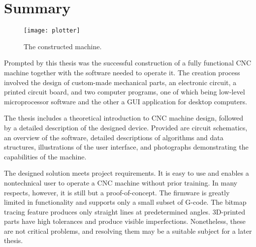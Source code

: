 \clearpage
\section{Summary}

\begin{figure}[ht]
    \begin{center}
        \texttt{[image: plotter]}
        \caption{The constructed machine.}
    \end{center}
\end{figure}

Prompted by this thesis was the successful construction of a fully functional CNC
machine together with the software needed to operate it. The creation process
involved the design of custom-made mechanical parts, an electronic circuit,
a printed circuit board, and two computer programs, one of which being low-level
microprocessor software and the other a GUI application for desktop computers.

The thesis includes a theoretical introduction to CNC machine design, followed
by a detailed description of the designed device. Provided are circuit
schematics, an overview of the software, detailed descriptions of algorithms
and data structures, illustrations of the user interface, and photographs
demonstrating the capabilities of the machine.

The designed solution meets project requirements. It is easy to use and enables
a non\-technical user to operate a CNC machine without prior training. In many
respects, however, it is still but a proof-of-concept. The firmware is greatly
limited in functionality and supports only a small subset of G-code. The bitmap
tracing feature produces only straight lines at predetermined angles.
3D-printed parts have high tolerances and produce visible imperfections.
Nonetheless, these are not critical problems, and resolving them may be a
suitable subject for a later thesis.
